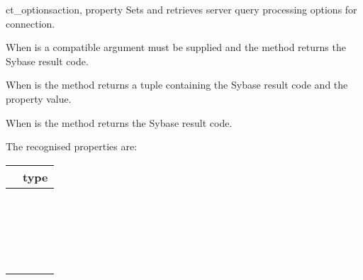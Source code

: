 \begin{methoddesc}[CS_CONNECTION]{ct_options}{action, property }
Sets and retrieves server query processing options for connection.

When  is  a compatible  argument
must be supplied and the method returns the Sybase result code.

When  is  the method returns a tuple
containing the Sybase result code and the property value.

When  is  the method returns the Sybase
result code.

The recognised properties are:

\begin{longtable}{l|l}
\var{property} & type \\
\hline
\code{CS_OPT_ANSINULL}       & \code{bool} \\
\code{CS_OPT_ANSIPERM}       & \code{bool} \\
\code{CS_OPT_ARITHABORT}     & \code{bool} \\
\code{CS_OPT_ARITHIGNORE}    & \code{bool} \\
\code{CS_OPT_CHAINXACTS}     & \code{bool} \\
\code{CS_OPT_CURCLOSEONXACT} & \code{bool} \\
\code{CS_OPT_FIPSFLAG}       & \code{bool} \\
\code{CS_OPT_FORCEPLAN}      & \code{bool} \\
\code{CS_OPT_FORMATONLY}     & \code{bool} \\
\code{CS_OPT_GETDATA}        & \code{bool} \\
\code{CS_OPT_NOCOUNT}        & \code{bool} \\
\code{CS_OPT_NOEXEC}         & \code{bool} \\
\code{CS_OPT_PARSEONLY}      & \code{bool} \\
\code{CS_OPT_QUOTED_IDENT}   & \code{bool} \\
\code{CS_OPT_RESTREES}       & \code{bool} \\
\code{CS_OPT_SHOWPLAN}       & \code{bool} \\
\code{CS_OPT_STATS_IO}       & \code{bool} \\
\code{CS_OPT_STATS_TIME}     & \code{bool} \\
\code{CS_OPT_STR_RTRUNC}     & \code{bool} \\
\code{CS_OPT_TRUNCIGNORE}    & \code{bool} \\


\end{longtable}
\end{methoddesc}
